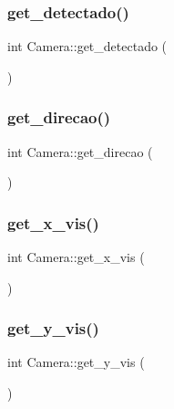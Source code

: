 \mbox{\label{classCamera_a3b6202883eadc2e3b94f4cd1a2929111}} 
\subsubsection{\texorpdfstring{get\+\_\+detectado()}{get\_detectado()}}
{\footnotesize\ttfamily int Camera\+::get\+\_\+detectado (\begin{DoxyParamCaption}{ }\end{DoxyParamCaption})}

\mbox{\label{classCamera_afd13cc91a3ce9a4d4d6b6dbb622ce7a4}} 
\subsubsection{\texorpdfstring{get\+\_\+direcao()}{get\_direcao()}}
{\footnotesize\ttfamily int Camera\+::get\+\_\+direcao (\begin{DoxyParamCaption}{ }\end{DoxyParamCaption})}

\mbox{\label{classCamera_a7b38e3e530865054f4425add99421f96}} 
\subsubsection{\texorpdfstring{get\+\_\+x\+\_\+vis()}{get\_x\_vis()}}
{\footnotesize\ttfamily int Camera\+::get\+\_\+x\+\_\+vis (\begin{DoxyParamCaption}{ }\end{DoxyParamCaption})}

\mbox{\label{classCamera_ad4ed7f3d1e12fc637ae8bbe9fad08430}} 
\subsubsection{\texorpdfstring{get\+\_\+y\+\_\+vis()}{get\_y\_vis()}}
{\footnotesize\ttfamily int Camera\+::get\+\_\+y\+\_\+vis (\begin{DoxyParamCaption}{ }\end{DoxyParamCaption})}

